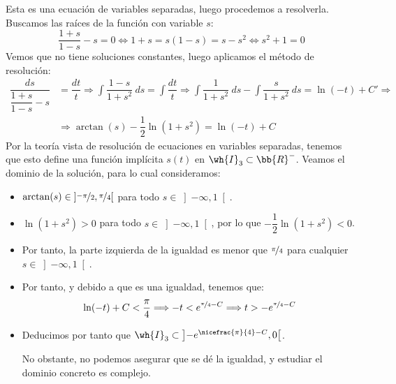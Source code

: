 \begin{ejercicio}
    Esta es una ecuación de variables separadas, luego procedemos a resolverla. Buscamos las raíces de la función con variable $s$:
    \begin{equation*}
        \dfrac{1+s}{1-s} - s = 0 \Longleftrightarrow 1+s = s(1-s) = s-s^2 \Longleftrightarrow s^2+1=0
    \end{equation*}
    Vemos que no tiene soluciones constantes, luego aplicamos el método de resolución:
    \begin{align*}
        \dfrac{ds}{\dfrac{1+s}{1-s} - s} &= \dfrac{dt}{t} \Longrightarrow \int \dfrac{1-s}{1+s^2} ~ds = \int \dfrac{dt}{t} \Longrightarrow \int \dfrac{1}{1+s^2} ~ds - \int \dfrac{s}{1+s^2} ~ds = \ln(-t)+C'
        \Longrightarrow \\ &\Longrightarrow \arctan(s) - \dfrac{1}{2}\ln(1+s^2) = \ln(-t)+C
    \end{align*}
    Por la teoría vista de resolución de ecuaciones en variables separadas, tenemos que esto define una función implícita $s(t)$ en $\wh{I}_3\subset \bb{R}^-$. Veamos el dominio de la solución, para lo cual consideramos:
    \begin{itemize}
        \item $\arctan(s)\in \left]\nicefrac{-\pi}{2},\nicefrac{\pi}{4}\right[$ para todo $s\in \left]-\infty,1\right[$.
        \item $\ln(1+s^2)>0$ para todo $s\in \left]-\infty,1\right[$, por lo que $-\dfrac{1}{2}\ln(1+s^2)<0$.
        \item Por tanto, la parte izquierda de la igualdad es menor que $\nicefrac{\pi}{4}$ para cualquier $s\in \left]-\infty,1\right[$.
        \item Por tanto, y debido a que es una igualdad, tenemos que:
        \begin{equation*}
            \ln(-t)+C<\frac{\pi}{4} \Longrightarrow -t<e^{\nicefrac{\pi}{4}-C} \Longrightarrow t>-e^{\nicefrac{\pi}{4}-C}
        \end{equation*}
        \item Deducimos por tanto que $\wh{I}_3\subset \left]-e^{\nicefrac{\pi}{4}-C},0\right[$.
        
        No obstante, no podemos asegurar que se dé la igualdad, y estudiar el dominio concreto es complejo.
    \end{itemize}


\end{ejercicio}
